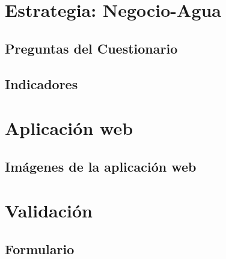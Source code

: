 \section{Estrategia: Negocio-Agua}
\subsection{Preguntas del Cuestionario}\label{apx:preguntas}


\subsection{Indicadores}\label{apx:indicadores}


\section{Aplicación web}
\subsection{Imágenes de la aplicación web}\label{apx:imagenes-app-web}


\section{Validación}
\subsection{Formulario}\label{apx:formulario}


